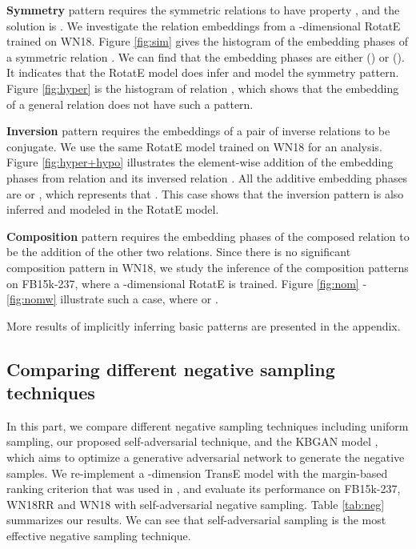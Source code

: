 \documentclass{article} \usepackage{iclr2019_conference,times}
\def\method{RotatE}
\begin{document}
\textbf{Symmetry} pattern requires the symmetric relations to have property , and the solution is . We investigate the relation embeddings from a -dimensional \method{} trained on WN18. Figure \ref{fig:sim} gives the histogram of the embedding phases of a symmetric relation . We can find that the embedding phases are either  () or  (). It indicates that the \method{} model does infer and model the symmetry pattern. Figure \ref{fig:hyper} is the histogram of relation , which shows that the embedding of a general relation does not have such a  pattern.

\textbf{Inversion} pattern requires the embeddings of a pair of inverse relations to be conjugate. We use the same \method{} model trained on WN18 for an analysis. Figure \ref{fig:hyper+hypo} illustrates the element-wise addition of the embedding phases from relation  and its inversed relation . All the additive embedding phases are  or , which represents that . This case shows that the inversion pattern is also inferred and modeled in the \method{} model.

\textbf{Composition} pattern requires the embedding phases of the composed relation to be the addition of the other two relations. Since there is no significant composition pattern in WN18, we study the inference of the composition patterns on FB15k-237, where a -dimensional \method{} is trained. Figure \ref{fig:nom} - \ref{fig:nomw} illustrate such a  case, where  or  . 

More results of implicitly inferring basic patterns are presented in the appendix.

\subsection{Comparing different negative sampling techniques}
In this part, we compare different negative sampling  techniques including uniform sampling, our proposed self-adversarial technique, and the KBGAN model \citep{cai2017kbgan}, which aims to
optimize a generative adversarial network to generate the negative samples. We re-implement a -dimension TransE model with the margin-based ranking criterion that was used in \citep{cai2017kbgan}, and evaluate its performance on FB15k-237, WN18RR and WN18 with self-adversarial negative sampling. Table \ref{tab:neg} summarizes our results. We can see that self-adversarial sampling is the most effective negative sampling technique.
\end{document}

